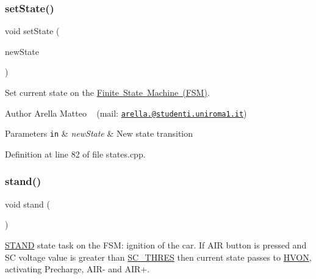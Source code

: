 \subsubsection{\texorpdfstring{set\+State()}{setState()}}
{\footnotesize\ttfamily void set\+State (\begin{DoxyParamCaption}\item[{\mbox{\hyperlink{group__stages__group_ga29e04432d3efcac24a5ae62572a6e8f2}{e\+\_\+node\+State}}}]{new\+State }\end{DoxyParamCaption})}



Set current state on the \mbox{\hyperlink{_f_s_m_page}{Finite State Machine (F\+SM)}}. 

\begin{DoxyAuthor}{Author}
Arella Matteo ~\newline
 (mail\+: \href{mailto:arella.1646983@studenti.uniroma1.it}{\tt arella.@studenti.\+uniroma1.\+it})
\end{DoxyAuthor}

\begin{DoxyParams}[1]{Parameters}
\mbox{\tt in}  & {\em new\+State} & New state transition \\
\hline
\end{DoxyParams}


Definition at line 82 of file states.\+cpp.

\mbox{\label{group__stages__group_ga506140395cba78bffc95d77985780ca5}} 
\subsubsection{\texorpdfstring{stand()}{stand()}}
{\footnotesize\ttfamily void stand (\begin{DoxyParamCaption}{ }\end{DoxyParamCaption})}



\mbox{\hyperlink{_f_s_m_page_STAND}{S\+T\+A\+ND}} state task on the F\+SM\+: ignition of the car. If A\+IR button is pressed and SC voltage value is greater than \mbox{\hyperlink{group__stages__group_ga9688af4f17ae88b4d149269d71b7ff1f}{S\+C\+\_\+\+T\+H\+R\+ES}} then current state passes to \mbox{\hyperlink{_f_s_m_page_HVON}{H\+V\+ON}}, activating Precharge, A\+I\+R-\/ and A\+I\+R+. 

